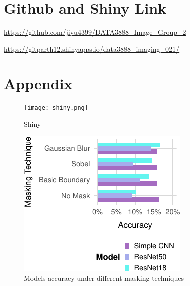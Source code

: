 \documentclass[letterpaper,9pt,twocolumn,twoside,]{pinp}
\begin{document}
\hypertarget{github-and-shiny-link}{%
\section{Github and Shiny Link}\label{github-and-shiny-link}}

\url{https://github.com/jiyu4399/DATA3888_Image_Group_2}

\url{https://gitparth12.shinyapps.io/data3888_imaging_021/}

\hypertarget{appendix}{%
\section{Appendix}\label{appendix}}

\begin{figure}[h]
    \raggedright
    \texttt{[image: shiny.png]}
    \caption{Shiny}
    \label{fig:Shiny}
\end{figure}

\begin{figure}[h]

{\centering \includegraphics{Image02_final_report_files/figure-latex/unnamed-chunk-6-1} 

}

\caption{Models accuracy under different masking techniques}\label{fig:unnamed-chunk-6}
\end{figure}
\end{document}
